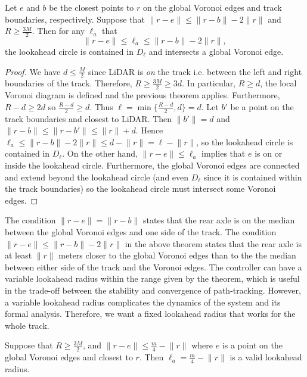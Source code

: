 \begin{theorem}
Let $e$ and $b$ be the closest points to $r$ on the global Voronoi edges and track boundaries, respectively.
%
Suppose that 
$\lVert r-e \rVert \leq \lVert r-b \rVert - 2 \lVert r \rVert$ and 
$R \geq \frac{3M}{2}$.
%
Then for any $\ell_a$ that 
$$
\lVert r-e \rVert 
\leq \ell_a
\leq \lVert r-b \rVert - 2 \lVert r \rVert,
$$
the lookahead circle is contained in $D_\ell$ and intersects a global Voronoi edge.
\end{theorem}

\begin{proof}
We have $d \leq \frac{M}{2}$ since LiDAR is \emph{on} the track i.e. between the left and right boundaries of the track.
%
Therefore, $R \geq \frac{3M}{2} \geq 3d$.
%
In particular, $R \geq d$, the local Voronoi diagram is defined and the previous theorem applies.
%
Furthermore,
$R-d \geq 2d$ so $\frac{R-d}{2} \geq d$.
%
Thus $\ell = \min \{ \frac{R-d}{2}, d \} = d$.
%
Let $b'$ be a point on the track boundaries and closest to LiDAR.
%
Then $ \lVert b' \rVert = d$ and
$\lVert r-b \rVert 
\leq \lVert r-b' \rVert 
\leq \lVert r \rVert + d $.
%
Hence
$\ell_a 
\leq \lVert r-b \rVert - 2 \lVert r \rVert
\leq d - \lVert r \rVert
= \ell - \lVert r \rVert$,
so the lookahead circle is contained in $D_\ell$.
%
On the other hand, $\lVert r-e \rVert \leq \ell_a$ implies that $e$ is on or inside the lookahead circle.
%
Furthermore, the global Voronoi edges are connected and extend beyond the lookahead circle (and even $D_\ell$ since it is contained within the track boundaries) so the lookahead circle must intersect some Voronoi edges.
\end{proof}

The condition $\lVert r-e \rVert = \lVert r-b \rVert $ states that the rear axle is on the median between the global Voronoi edges and one side of the track.
%
The condition $\lVert r-e \rVert \leq \lVert r-b \rVert - 2 \lVert r \rVert$ in the above theorem states that the rear axle is at least $\lVert r \rVert$ meters closer to the global Voronoi edges than to the the median between either side of the track and the Voronoi edges.
%
The controller can have a variable lookahead radius within the range given by the theorem, which is useful in the trade-off between the stability and convergence of path-tracking.
%
However, a variable lookahead radius complicates the dynamics of the system and its formal analysis.
%
Therefore, we want a fixed lookahead radius that works for the whole track.


\begin{corollary}
Suppose that $R \geq \frac{3M}{2}$, and $\lVert r-e \rVert \leq \frac{m}{4} - \lVert r \rVert $ where $e$ is a point on the global Voronoi edges and closest to $r$.
%
Then $\ell_a = \frac{m}{4} - \lVert r \rVert$ is a valid lookahead radius.
\end{corollary}


